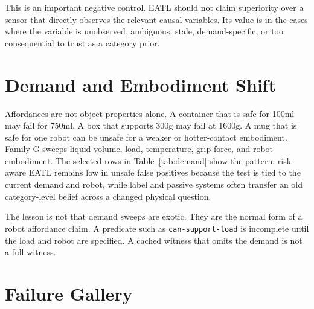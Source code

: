 \documentclass{article}
\begin{document}
\begin{table}[t]
\centering
\scriptsize
\resizebox{\linewidth}{!}{}
\caption{Visibility ladder for passive systems.  The result narrows the claim:
executable tests are not needed when passive sensing already observes the
deciding physical variables reliably.}
\label{tab:visibility}
\end{table}

This is an important negative control.  EATL should not claim superiority over
a sensor that directly observes the relevant causal variables.  Its value is in
the cases where the variable is unobserved, ambiguous, stale, demand-specific,
or too consequential to trust as a category prior.

\section{Demand and Embodiment Shift}

Affordances are not object properties alone.  A container that is safe for
100ml may fail for 750ml.  A box that supports 300g may fail at 1600g.  A mug
that is safe for one robot can be unsafe for a weaker or hotter-contact
embodiment.  Family G sweeps liquid volume, load, temperature, grip force, and
robot embodiment.  The selected rows in Table~\ref{tab:demand} show the pattern:
risk-aware EATL remains low in unsafe false positives because the test is tied
to the current demand and robot, while label and passive systems often transfer
an old category-level belief across a changed physical question.

\begin{table}[t]
\centering
\scriptsize
\resizebox{\linewidth}{!}{}
\caption{Selected demand and embodiment shift rows.  The same object label can
change truth value as volume, load, temperature, grip force, or robot body
changes.}
\label{tab:demand}
\end{table}

The lesson is not that demand sweeps are exotic.  They are the normal form of a
robot affordance claim.  A predicate such as \texttt{can-support-load} is
incomplete until the load and robot are specified.  A cached witness that omits
the demand is not a full witness.

\section{Failure Gallery}
\end{document}
